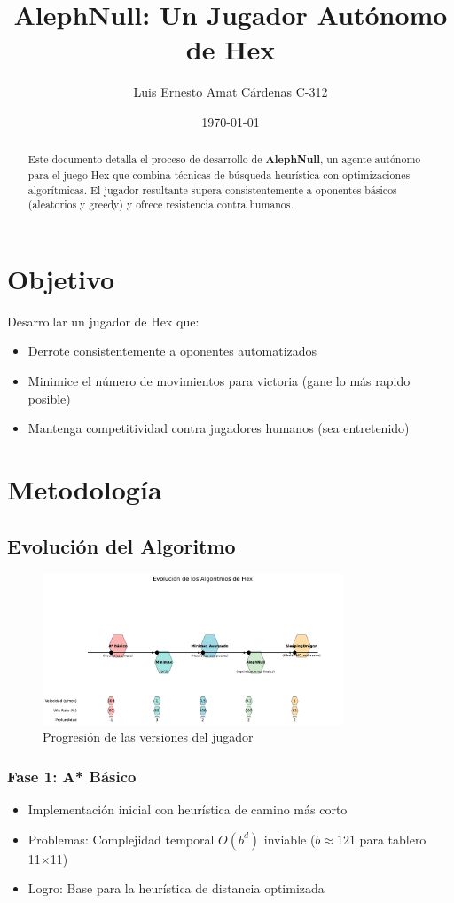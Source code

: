 \documentclass{article}
\title{AlephNull: Un Jugador Autónomo de Hex}
\author{Luis Ernesto Amat Cárdenas C-312}
\date{\today}
\begin{document}
\maketitle

\begin{abstract}
Este documento detalla el proceso de desarrollo de \textbf{AlephNull}, un agente autónomo para el juego Hex que combina técnicas de búsqueda heurística con optimizaciones algorítmicas. El jugador resultante supera consistentemente a oponentes básicos (aleatorios y greedy) y ofrece resistencia contra humanos.
\end{abstract}

\section{Objetivo}
Desarrollar un jugador de Hex que:
\begin{itemize}
\item Derrote consistentemente a oponentes automatizados
\item Minimice el número de movimientos para victoria (gane lo más rapido posible)
\item Mantenga competitividad contra jugadores humanos (sea entretenido)
\end{itemize}

\section{Metodología}
\subsection{Evolución del Algoritmo}
\begin{figure}[h]
\centering
\includegraphics[width=0.8\textwidth]{evolucion_algoritmos.pdf}
\caption{Progresión de las versiones del jugador}
\end{figure}

\subsubsection*{Fase 1: A* Básico}
\begin{itemize}
\item Implementación inicial con heurística de camino más corto
\item Problemas: Complejidad temporal $O(b^d)$ inviable ($b \approx 121$ para tablero 11×11)
\item Logro: Base para la heurística de distancia optimizada
\end{itemize}
\end{document}
